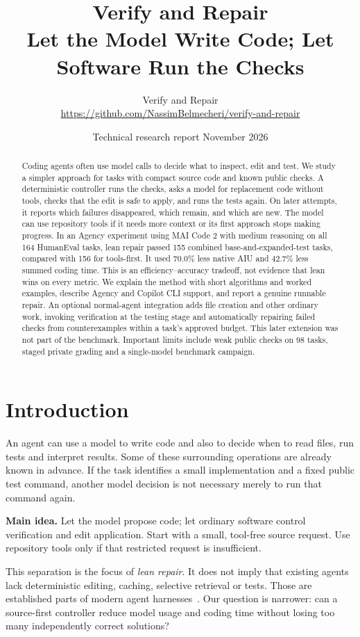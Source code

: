 \documentclass[10pt,twocolumn,a4paper]{article}
\title{\textbf{Verify and Repair}\\
  \large Let the Model Write Code; Let Software Run the Checks}
\author{Verify and Repair\\
  \small\url{https://github.com/NassimBelmecheri/verify-and-repair}}
\date{\small Technical research report \quad 23 November 2026}
\begin{document}
\maketitle

\begin{abstract}
Coding agents often use model calls to decide what to inspect, edit and test.
We study a simpler approach for tasks with compact source code and known
public checks. A deterministic controller runs the checks, asks a model for
replacement code without tools, checks that the edit is safe to apply, and
runs the tests again. On later attempts, it reports which failures disappeared,
which remain, and which are new. The model can use repository tools if it
needs more context or its first approach stops making progress.
In an Agency experiment using MAI Code 2 with medium reasoning on all
164 HumanEval tasks, lean repair passed 155 combined base-and-expanded-test tasks,
compared with 156 for tools-first. It used 70.0\% less
native AIU and 42.7\% less summed coding time. This is an
efficiency--accuracy tradeoff, not evidence that lean wins on every metric.
We explain the method with short algorithms and worked examples, describe
Agency and Copilot CLI support, and report a genuine runnable repair.
An optional normal-agent integration adds file creation and other ordinary
work, invoking verification at the testing stage and automatically repairing
failed checks from counterexamples within a task's approved budget.
This later extension was not part of the benchmark.
Important limits include weak public checks on 98 tasks, staged private
grading and a single-model benchmark campaign.
\end{abstract}

\section{Introduction}
An agent can use a model to write code and also to decide when to read files,
run tests and interpret results. Some of these surrounding operations are
already known in advance. If the task identifies a small implementation and
a fixed public test command, another model decision is not necessary merely
to run that command again.

\textbf{Main idea.} Let the model propose code; let ordinary software control
verification and edit application. Start with a small, tool-free source
request. Use repository tools only if that restricted request is insufficient.

This separation is the focus of \emph{lean repair}. It does not imply that
existing agents lack deterministic editing, caching, selective retrieval or
tests. Those are established parts of modern agent harnesses~\cite{codex,claude}.
Our question is narrower: can a source-first controller reduce model usage
and coding time without losing too many independently correct solutions?
\end{document}
